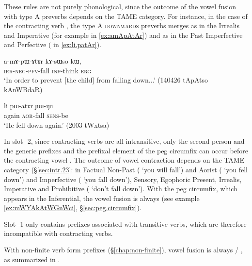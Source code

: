  These rules are not purely phonological, since the outcome of the vowel fusion with type A preverbs depends on the TAME category. For instance, in the case of the contracting verb , the type A \textsc{downwards}  preverbs merges as  in the Irrealis and Imperative (for example   in \ref{ex:amApAtAr}) and as  in the Past Imperfective and Perfective (  in \ref{ex:li.patAr}).
 
 \begin{exe}
 	\ex \label{ex:amApAtAr}
 	\gll   a-mɤ-pɯ-ɤtɤr kɤ-sɯso kɯ, \\
 	\textsc{irr}-\textsc{neg}-\textsc{pfv}-fall \textsc{inf}-think \textsc{erg} \\
 	\glt `In order to prevent [the child] from falling down...' (140426 tApAtso kAnWBdaR)
 \end{exe}
 
 \begin{exe}
 	\ex \label{ex:li.patAr}
 	\gll li pɯ-atɤr ɲɯ-ŋu \\
 	again \textsc{aor}-fall \textsc{sens}-be \\
 	\glt `He fell down again.' (2003 tWxtsa)
 \end{exe}
 
 In slot -2, since contracting verbs are all intransitive, only the second person  and the generic  prefixes and the prefixal element  of the peg circumfix can occur before the contracting vowel . The outcome of vowel contraction depends on the TAME category (§\ref{sec:intr.23}:   in Factual Non-Past ( `you will fall') and Aorist ( `you fell down') and    Imperfective ( `you fall down'), Sensory, Egophoric Present, Irrealis, Imperative and Prohibitive ( `don't fall down'). With the peg circumfix, which appears in the Inferential, the vowel fusion is always  (see example \ref{ex:mWYAkAtWGnWci}, §\ref{sec:peg.circumfix}).
 
 Slot -1 only contains prefixes associated with transitive verbs, which are therefore incompatible with contracting verbs.
 
 With non-finite verb form prefixes  (§\ref{chap:non-finite}),  vowel fusion is always  / , as summarized in .
 
